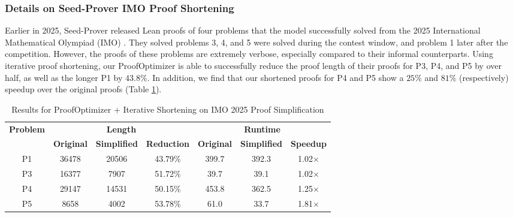 \subsubsection{Details on Seed-Prover IMO Proof Shortening} \label{subsec-imo-proof-shortening}

Earlier in 2025, Seed-Prover released Lean proofs of four problems that the model successfully solved from the 2025 International Mathematical Olympiad (IMO) \citep{chen2507seed}. They solved problems 3, 4, and 5 were solved during the contest window, and problem 1 later after the competition. However, the proofs of these problems are extremely verbose, especially compared to their informal counterparts. Using iterative proof shortening, our ProofOptimizer is able to successfully reduce the proof length of their proofs for P3, P4, and P5 by over half, as well as the longer P1 by $43.8\%$. In addition, we find that our shortened proofs for P4 and P5 show a $25\%$ and $81\%$ (respectively) speedup over the original proofs (Table \ref{tab:seed-imo-results-all}).

\begin{table}[H]
\caption{Results for ProofOptimizer + Iterative Shortening on IMO 2025 Proof Simplification}
\label{tab:seed-imo-results-all}
\centering
\begin{tabular}{c ccc ccc}
\toprule
\multirow{2}{*}{\textbf{Problem}} 
 & \multicolumn{3}{c}{\textbf{Length}} 
 & \multicolumn{3}{c}{\textbf{Runtime}} \\
\cmidrule(lr){2-4} \cmidrule(lr){5-7}
 & \textbf{Original} & \textbf{Simplified} & \textbf{Reduction} 
 & \textbf{Original} & \textbf{Simplified} & \textbf{Speedup} \\
\midrule
P1 & 36478 & 20506 & 43.79\% & 399.7 & 392.3 & 1.02$\times$ \\
P3 & 16377 & 7907  & 51.72\% & 39.7  & 39.1  & 1.02$\times$ \\
P4 & 29147 & 14531 & 50.15\% & 453.8 & 362.5 & 1.25$\times$ \\
P5 & 8658  & 4002  & 53.78\% & 61.0  & 33.7  & 1.81$\times$ \\
\bottomrule
\end{tabular}
\end{table}


